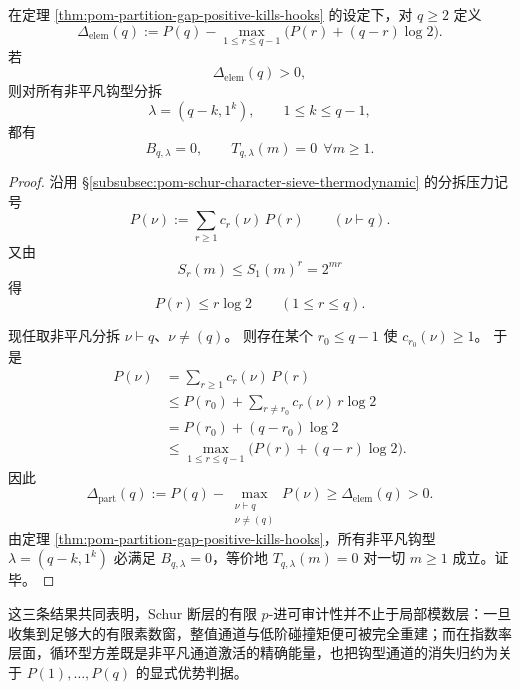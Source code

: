 \begin{theorem}[单变量压力优势强制全部非平凡钩型通道湮灭]\label{thm:xi-time-part63-elementary-pressure-gap-kills-hooks}
在定理 \ref{thm:pom-partition-gap-positive-kills-hooks} 的设定下，对 \(q\ge 2\) 定义
\[
\Delta_{\mathrm{elem}}(q):=
P(q)-
\max_{1\le r\le q-1}\bigl(P(r)+(q-r)\log 2\bigr).
\]
若
\[
\Delta_{\mathrm{elem}}(q)>0,
\]
则对所有非平凡钩型分拆
\[
\lambda=(q-k,1^k),\qquad 1\le k\le q-1,
\]
都有
\[
\boxed{\;
B_{q,\lambda}=0,
\qquad
T_{q,\lambda}(m)=0\ \ \forall m\ge 1.\;}
\]
\end{theorem}
\begin{proof}
沿用 \S\ref{subsubsec:pom-schur-character-sieve-thermodynamic} 的分拆压力记号
\[
P(\nu):=\sum_{r\ge 1}c_r(\nu)\,P(r)\qquad(\nu\vdash q).
\]
又由
\[
S_r(m)\le S_1(m)^r=2^{mr}
\]
得
\[
P(r)\le r\log 2\qquad(1\le r\le q).
\]

现任取非平凡分拆 \(\nu\vdash q\)、\(\nu\neq(q)\)。
则存在某个 \(r_0\le q-1\) 使 \(c_{r_0}(\nu)\ge 1\)。
于是
\[
\begin{aligned}
P(\nu)
&=
\sum_{r\ge 1}c_r(\nu)\,P(r)\\
&\le
P(r_0)+
\sum_{r\neq r_0}c_r(\nu)\,r\log 2\\
&=
P(r_0)+(q-r_0)\log 2\\
&\le
\max_{1\le r\le q-1}\bigl(P(r)+(q-r)\log 2\bigr).
\end{aligned}
\]
因此
\[
\Delta_{\mathrm{part}}(q)
:=
P(q)-\max_{\substack{\nu\vdash q\\ \nu\neq(q)}}P(\nu)
\ge
\Delta_{\mathrm{elem}}(q)>0.
\]
由定理 \ref{thm:pom-partition-gap-positive-kills-hooks}，所有非平凡钩型
\(\lambda=(q-k,1^k)\) 必满足 \(B_{q,\lambda}=0\)，等价地
\(
T_{q,\lambda}(m)=0
\)
对一切 \(m\ge 1\) 成立。证毕。
\end{proof}

\noindent
这三条结果共同表明，Schur 断层的有限 \(p\)-进可审计性并不止于局部模数层：一旦收集到足够大的有限素数窗，整值通道与低阶碰撞矩便可被完全重建；而在指数率层面，循环型方差既是非平凡通道激活的精确能量，也把钩型通道的消失归约为关于 \(P(1),\dots,P(q)\) 的显式优势判据。




\endinput
